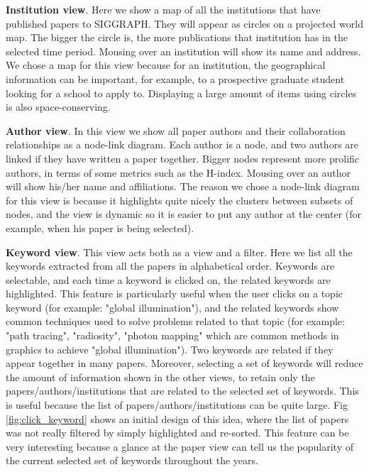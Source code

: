 \documentclass[12pt]{article}
\begin{document}
\textbf{Institution view}. Here we show a map of all the institutions that have published papers to SIGGRAPH. They will appear as circles on a projected world map. The bigger the circle is, the more publications that institution has in the selected time period. Mousing over an institution will show its name and address. We chose a map for this view because for an institution, the geographical information can be important, for example, to a prospective graduate student looking for a school to apply to. Displaying a large amount of items using circles is also space-conserving.

\textbf{Author view}. In this view we show all paper authors and their collaboration relationships as a node-link diagram. Each author is a node, and two authors are linked if they have written a paper together. Bigger nodes represent more prolific authors, in terms of some metrics such as the H-index. Mousing over an author will show his/her name and affiliations. The reason we chose a node-link diagram for this view is because it highlights quite nicely the clusters between subsets of nodes, and the view is dynamic so it is easier to put any author at the center (for example, when his paper is being selected).

\textbf{Keyword view}. This view acts both as a view and a filter. Here we list all the keywords extracted from all the papers in alphabetical order. Keywords are selectable, and each time a keyword is clicked on, the related keywords are highlighted. This feature is particularly useful when the user clicks on a topic keyword (for example: "global illumination"), and the related keywords show common techniques used to solve problems related to that topic (for example: "path tracing", "radiosity", "photon mapping" which are common methods in graphics to achieve "global illumination"). Two keywords are related if they appear together in many papers. Moreover, selecting a set of keywords will reduce the amount of information shown in the other views, to retain only the papers/authors/institutions that are related to the selected set of keywords. This is useful because the list of papers/authors/institutions can be quite large. Fig \ref{fig:click_keyword} shows an initial design of this idea, where the list of papers was not really filtered by simply highlighted and re-sorted. This feature can be very interesting because a glance at the paper view can tell us the popularity of the current selected set of keywords throughout the years.
\end{document}
